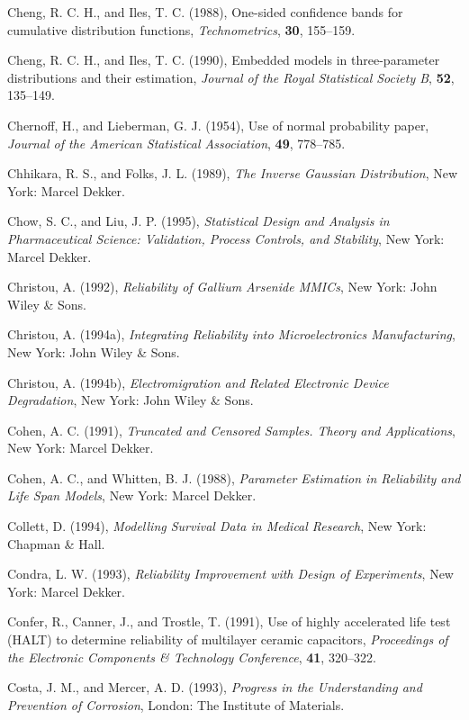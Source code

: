 \begin{thebibliography}{999}
Cheng, R. C. H., and Iles, T. C. (1988), One-sided confidence bands
for cumulative distribution functions, {\em Technometrics}, {\bf
30}, 155--159.

Cheng, R. C. H., and Iles, T. C. (1990), Embedded models in
three-parameter distributions and their estimation, {\em Journal of
the Royal Statistical Society B}, {\bf 52}, 135--149.

Chernoff, H., and Lieberman, G. J.  (1954), Use of normal
probability paper, {\em Journal of the American Statistical
Association}, {\bf 49}, 778--785.

Chhikara, R. S., and Folks, J. L. (1989), {\em The Inverse Gaussian
Distribution}, New York: Marcel Dekker.

Chow, S. C., and Liu, J. P. (1995), {\em Statistical Design and
Analysis in Pharmaceutical Science: Validation, Process Controls,
and Stability}, New York: Marcel Dekker.

Christou, A. (1992), {\em Reliability of Gallium Arsenide MMICs},
New York: John Wiley \& Sons.

Christou, A. (1994a), {\em Integrating Reliability into
Microelectronics Manufacturing}, New York: John Wiley \& Sons.

Christou, A. (1994b), {\em Electromigration and Related Electronic Device
Degradation}, New York: John Wiley \& Sons.

Cohen, A. C. (1991),
{\em Truncated and Censored Samples. Theory and Applications},
New York:  Marcel Dekker.

Cohen, A. C., and Whitten, B. J. (1988),
{\em Parameter Estimation in Reliability and Life Span Models},
New York:  Marcel Dekker.

Collett, D. (1994),
{\em Modelling Survival Data in Medical Research}, New York:
Chapman \& Hall.

Condra, L. W.  (1993), {\em Reliability Improvement with Design of
Experiments}, New York: Marcel Dekker.

Confer, R., Canner, J., and Trostle, T. (1991), Use of highly
accelerated life test (HALT) to determine reliability of multilayer
ceramic capacitors, {\em Proceedings of the Electronic Components \&
Technology Conference}, {\bf 41}, 320--322.

Costa, J. M., and Mercer, A. D. (1993), {\em Progress in the
Understanding and Prevention of Corrosion}, London: The Institute of
Materials.


\end{thebibliography}
